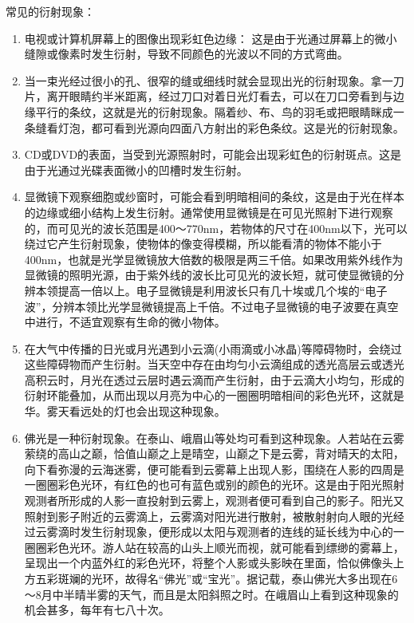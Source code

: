 \documentclass[dvipsnames, svgnames,a4paper,11pt]{article}
\begin{document}
	常见的衍射现象：	
	\begin{enumerate}
		\item 电视或计算机屏幕上的图像出现彩虹色边缘：
		这是由于光通过屏幕上的微小缝隙或像素时发生衍射，导致不同颜色的光波以不同的方式弯曲。		
		\item 当一束光经过很小的孔、很窄的缝或细线时就会显现出光的衍射现象。拿一刀片，离开眼睛约半米距离，经过刀口对着日光灯看去，可以在刀口旁看到与边缘平行的条纹，这就是光的衍射现象。隔着纱、布、鸟的羽毛或把眼睛眯成一条缝看灯泡，都可看到光源向四面八方射出的彩色条纹。这是光的衍射现象。		
		\item CD或DVD的表面，当受到光源照射时，可能会出现彩虹色的衍射斑点。这是由于光通过光碟表面微小的凹槽时发生衍射。		
		\item 显微镜下观察细胞或纱窗时，可能会看到明暗相间的条纹，这是由于光在样本的边缘或细小结构上发生衍射。通常使用显微镜是在可见光照射下进行观察的，而可见光的波长范围是400～770nm，若物体的尺寸在400nm以下，光可以绕过它产生衍射现象，使物体的像变得模糊，所以能看清的物体不能小于400nm，也就是光学显微镜放大倍数的极限是两三千倍。如果改用紫外线作为显微镜的照明光源，由于紫外线的波长比可见光的波长短，就可使显微镜的分辨本领提高一倍以上。电子显微镜是利用波长只有几十埃或几个埃的“电子波”，分辨本领比光学显微镜提高上千倍。不过电子显微镜的电子波要在真空中进行，不适宜观察有生命的微小物体。
		\item 在大气中传播的日光或月光遇到小云滴(小雨滴或小冰晶)等障碍物时，会绕过这些障碍物而产生衍射。当天空中存在由均匀小云滴组成的透光高层云或透光高积云时，月光在透过云层时遇云滴而产生衍射，由于云滴大小均匀，形成的衍射环能叠加，从而出现以月亮为中心的一圈圈明暗相间的彩色光环，这就是华。雾天看远处的灯也会出现这种现象。
		\item 佛光是一种衍射现象。在泰山、峨眉山等处均可看到这种现象。人若站在云雾萦绕的高山之巅，恰值山巅之上是晴空，山巅之下是云雾，背对晴天的太阳，向下看弥漫的云海迷雾，便可能看到云雾幕上出现人影，围绕在人影的四周是一圈圈彩色光环，有红色的也可有蓝色或别的颜色的光环。这是由于阳光照射观测者所形成的人影一直投射到云雾上，观测者便可看到自己的影子。阳光又照射到影子附近的云雾滴上，云雾滴对阳光进行散射，被散射射向人眼的光经过云雾滴时发生衍射现象，便形成以太阳与观测者的连线的延长线为中心的一圈圈彩色光环。游人站在较高的山头上顺光而视，就可能看到缥缈的雾幕上，呈现出一个内蓝外红的彩色光环，将整个人影或头影映在里面，恰似佛像头上方五彩斑斓的光环，故得名“佛光”或“宝光”。据记载，泰山佛光大多出现在6～8月中半晴半雾的天气，而且是太阳斜照之时。在峨眉山上看到这种现象的机会甚多，每年有七八十次。
	\end{enumerate}
	
\end{document}
